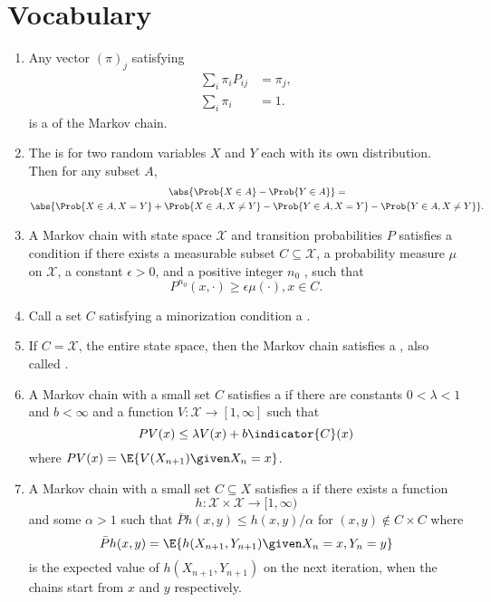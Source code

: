 \documentclass[12pt]{article}
\begin{document}
\section*{Vocabulary}
\begin{enumerate}
    \item
        Any vector \( (\pi)_{j} \) satisfying
        \begin{align}
            \sum\limits_{i} \pi_{i} P_{ij} &= \pi_{j},\\
            \sum\limits_{i} \pi_{i} &= 1.
        \end{align}
        is a  of the Markov
        chain.
    \item
        The  is for two random variables \( X \)
        and \( Y \) each with its own distribution.  Then for any subset
        \( A \),
        \begin{multline*}
            \abs{\Prob{X \in A} - \Prob{Y \in A}} = \\
            \abs{ \Prob{X \in A, X = Y} + \Prob{X \in A, X \ne Y } -
            \Prob{Y \in A, X = Y} - \Prob{Y \in A, X \ne Y}}.
        \end{multline*}
    \item
        A Markov chain with state space \( \mathcal{X} \) and transition
        probabilities \( P \) satisfies a  condition
        if there exists a measurable subset \( C \subseteq \mathcal{X} \),
        a probability measure \( \mu \) on \( \mathcal{X} \), a constant
        \( \epsilon > 0 \), and a positive integer \( n_0 \) , such that
        \[
            P^{n_0} (x, \cdot) \ge \epsilon \mu(\cdot), x \in C.
        \]
    \item
        Call a set \( C \) satisfying a minorization condition a .
    \item
        If \( C = \mathcal{X} \), the entire state space, then the
        Markov chain satisfies a ,
        also called .
    \item
        A Markov chain with a small set \( C \) satisfies a  if there are constants \( 0 < \lambda < 1 \)
        and \( b < \infty \) and a function \( V :  \mathcal{X} \to [1,
        \infty] \) such that
        \[
            PV(x) \le \lambda V(x) + b \indicator{C}(x)
        \] where \( PV(x) = \E{V(X_{n+1}) \given X_n = x} \).
    \item
        A Markov chain with a small set \( C \subseteq X \) satisfies a
         if there exists a function
        \[
            h :  \mathcal{X} \times \mathcal{X} \to [1, \infty)
        \] and some \( \alpha > 1 \) such that \( \bar{P}h(x,y) \le h(x,y)/\alpha
        \) for \( (x,y) \notin C \times C \) where
        \[
            \bar{P}h(x,y)= \E{h(X_{n+1}, Y_{n+1}) \given X_n = x, Y_n =
            y}
        \] is the expected value of \( h(X_{n+1}, Y_{n+1}) \) on the
        next iteration, when the chains start from \( x \) and \( y \)
        respectively.
\end{enumerate}
\end{document}
